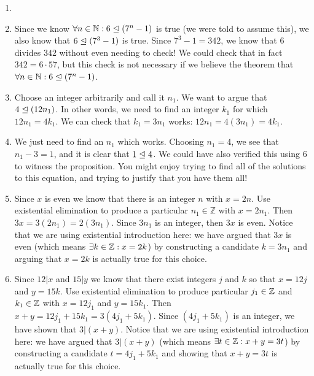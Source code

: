 \begin{solutions}	
	\begin{enumerate}
		\item[] \mbox{}
		\item Since we know $\forall n \in \mathbb{N}: 6 \trianglelefteq (7^n-1)$ is true (we were told to assume this), we also know that $6 \trianglelefteq (7^3-1)$ is true. Since $7^3-1 = 342$, we know that $6$ divides $342$ without even needing to check!  We could check that in fact $342 = 6 \cdot 57$, but this check is not necessary if we believe the theorem that$\forall n \in \mathbb{N}: 6  \trianglelefteq  (7^n-1)$. 
		
		\item Choose an integer arbitrarily and call it $n_1$.  We want to argue that $4 \trianglelefteq (12n_1)$.  In other words, we need to find an integer $k_1$ for which $12n_1 = 4k_1$.  We can check that $k_1 = 3n_1$ works:  $12n_1 = 4(3n_1) = 4k_1$.

		\item We just need to find an $n_1$ which works.  Choosing $n_1 = 4$, we see that $n_1 - 3 = 1$, and it is clear that $1 \trianglelefteq  4$.  We could have also verified this using $6$  to witness the proposition.  You might enjoy trying to find all of the solutions to this equation, and trying to justify that you have them all!
		
		\item Since $x$ is even we know that there is an integer $n$ with $x =2n$.  Use existential elimination to produce a particular $n_1 \in \mathbb{Z}$ with $x =2n_1$.  Then $3x  =3(2n_1) = 2(3n_1)$.  Since $3n_1$ is an integer, then $3x$ is even.  Notice that we are using existential introduction here:  we have argued that $3x$ is even (which means $\exists k \in \mathbb{Z} : x = 2k$) by constructing a candidate $k=3n_1$ and arguing that $x=2k$ is actually true for this choice.
		
		\item Since $12|x$ and $15|y$ we know that there exist integers $j$ and $k$ so that $x = 12j$ and $y=15k$.  Use existential elimination to produce particular $j_1 \in \mathbb{Z}$ and $k_1 \in \mathbb{Z}$ with $x = 12j_1$ and $y=15k_1$.  Then $x+y = 12j_1+15k_1 = 3(4j_1+5k_1)$.  Since $(4j_1+5k_1)$ is an integer, we have shown that $3|(x+y)$.  Notice that we are using existential introduction here:  we have argued that $3|(x+y)$ (which means $\exists t \in \mathbb{Z}: x+y = 3t$) by constructing a candidate $t = 4j_1+5k_1$ and showing that $x+y = 3t$ is actually true for this choice.
		 

\end{enumerate}
\end{solutions}
